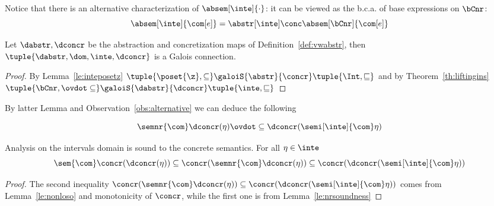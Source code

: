 \begin{observation}\label{obs:alternative}
  Notice that there is an alternative characterization of
  \(\absem[\inte]{\cdot}\): it can be viewed as the b.c.a. of base
  expressions on \(\bCnr\):
  \begin{equation*}
    \absem[\inte]{\com[e]} = \abstr[\inte] \conc \absem[\bCnr]{\com[e]}
  \end{equation*}
\end{observation}

\begin{lemma}
  Let \(\dabstr, \dconcr\) be the abstraction and concretization maps
  of Definition~\ref{def:vwabstr}, then
  \(\tuple{\dabstr, \dom, \inte, \dconcr}\) is a Galois connection.
\end{lemma}

\begin{proof}
  By Lemma~\ref{le:inteposetz}
  \(\tuple{\poset{\z}, \subseteq} \galoiS{\abstr}{\concr} \tuple{\Int,
    \sqsubseteq}\) and by Theorem~\ref{th:liftingins}
  \(\tuple{\bCnr, \ovdot\subseteq} \galoiS{\dabstr}{\dconcr}
  \tuple{\inte, \sqsubseteq}\)
\end{proof}

By latter Lemma and Observation~\ref{obs:alternative} we can deduce
the following

\begin{lemma}\label{le:nonloso}
  \begin{equation*}
    \semnr{\com}\dconcr(\eta) \ovdot\subseteq \dconcr(\semi[\inte]{\com}\eta)
  \end{equation*}
\end{lemma}

\begin{observation}
  Analysis on the intervals domain is sound to the concrete
  semantics. For all \(\eta\in\inte\)
  \begin{equation*}
    \sem{\com}\concr(\dconcr(\eta)) \subseteq \concr(\semnr{\com}\dconcr(\eta)) \subseteq \concr(\dconcr(\semi[\inte]{\com}\eta))
  \end{equation*}
\end{observation}

\begin{proof}
  The second inequality
  \(\concr(\semnr{\com}\dconcr(\eta)) \subseteq
  \concr(\dconcr(\semi[\inte]{\com}\eta))\) comes from
  Lemma~\ref{le:nonloso} and monotonicity of \(\concr\), while the
  first one is from Lemma~\ref{le:nrsoundness}
\end{proof}
  
